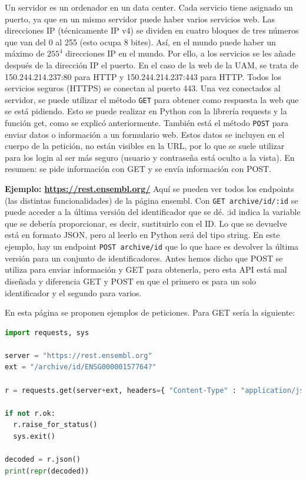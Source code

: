 Un servidor es un ordenador en un data center. Cada servicio tiene asignado un puerto, ya que en un mismo servidor puede haber varios servicios web. Las direcciones IP (técnicamente IP v4) se dividen en cuatro bloques de tres números que van del 0 al 255 (esto ocupa 8 bites). Así, en el mundo puede haber un máximo de $255^4$ direcciones IP en el mundo. Por ello, a los servicios se les añade después de la dirección IP el puerto. En el caso de la web de la UAM, se trata de 150.244.214.237:80 para HTTP y 150.244.214.237:443 para HTTP. Todos los servicios seguros (HTTPS) se conectan al puerto 443. Una vez conectados al servidor, se puede utilizar el método \texttt{GET} para obtener como respuesta la web que se está pidiendo. Esto se puede realizar en Python con la librería requests y la función get, como se explicó anteriormente. También está el método \texttt{POST} para enviar datos o información a un formulario web. Estos datos se incluyen en el cuerpo de la petición, no están visibles en la URL, por lo que se suele utilizar para los login al ser más seguro (usuario y contraseña está oculto a la vista). En resumen: se pide información con GET y se envía información con POST. 

\textbf{Ejemplo: \href{https://rest.ensembl.org/}{https://rest.ensembl.org/}}
Aquí se pueden ver todos los endpoints (las distintas funcionalidades) de la página ensembl. 
Con \texttt{GET archive/id/:id} se puede acceder a la última versión del identificador que se dé. :id indica la variable que se debería proporcionar, es decir, sustituirlo con el ID. Lo que se devuelve está en formato JSON, pero al leerlo en Python será del tipo string. En este ejemplo, hay un endpoint \texttt{POST archive/id} que lo que hace es devolver la última versión para un conjunto de identificadores. Antes hemos dicho que POST se utiliza para enviar información y GET para obtenerla, pero esta API está mal diseñada y diferencia GET y POST en que el primero es para un solo identificador y el segundo para varios.

En esta página se proponen ejemplos de peticiones. Para GET sería la siguiente:
\begin{lstlisting}[language=Python]
import requests, sys
 
server = "https://rest.ensembl.org"
ext = "/archive/id/ENSG00000157764?"
 
r = requests.get(server+ext, headers={ "Content-Type" : "application/json"})
 
if not r.ok:
  r.raise_for_status()
  sys.exit()
 
decoded = r.json()
print(repr(decoded))
\end{lstlisting}

